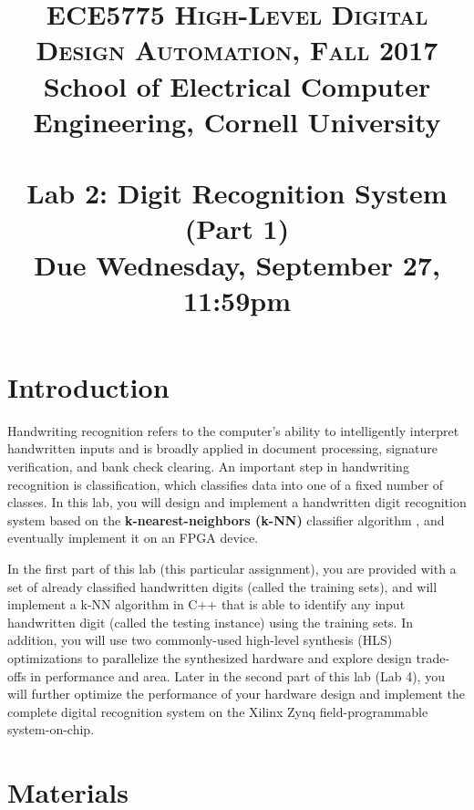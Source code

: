 \documentclass[paper=letter, fontsize=10pt]{scrartcl} %
\title{	
\normalfont \normalsize 
\textsc{ECE5775 High-Level Digital Design Automation, Fall 2017} \\  
School of Electrical Computer Engineering, Cornell University \\ [11pt]%
\horrule{0.5pt} \\[0.4cm] %
\large Lab 2: Digit Recognition System (Part 1) \\ %
\small Due Wednesday, September 27, 11:59pm
\horrule{0.5pt} \\[0.5cm] %
\vspace{-15ex}}
\date{}
\numberwithin{equation}{section} %
\numberwithin{figure}{section} %
\numberwithin{table}{section} %
\begin{document}
\maketitle %
\section{Introduction}

Handwriting recognition refers to the computer's ability to intelligently interpret handwritten inputs and is broadly applied in document processing, signature verification, and bank check clearing. An important step in handwriting recognition is classification, which classifies data into one of a fixed number of classes. In this lab, you will design and implement a handwritten digit recognition system based on the \textbf{k-nearest-neighbors (k-NN)} classifier algorithm \cite{knn}, and eventually implement it on an FPGA device. 


In the first part of this lab (this particular assignment), you are provided with a set of already classified handwritten digits (called the training sets), and will implement a k-NN algorithm in C++ that is able to identify any input handwritten digit (called the testing instance) using the training sets. In addition, you will use two commonly-used high-level synthesis (HLS) optimizations to parallelize the synthesized hardware and explore design trade-offs in performance and area. Later in the second part of this lab (Lab 4), you will further optimize the performance of your hardware design and implement the complete digital recognition system on the Xilinx Zynq field-programmable system-on-chip.


\section{Materials}
\label{materials}
\end{document}
